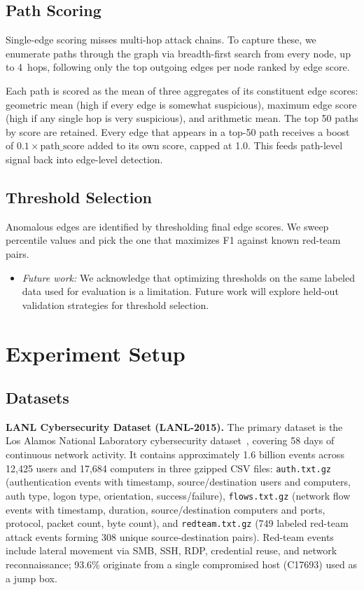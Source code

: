 \subsection{Path Scoring}

Single-edge scoring misses multi-hop attack chains. To capture these, we enumerate paths through the graph via breadth-first search from every node, up to 4~hops, following only the top outgoing edges per node ranked by edge score.

Each path is scored as the mean of three aggregates of its constituent edge scores: geometric mean (high if every edge is somewhat suspicious), maximum edge score (high if any single hop is very suspicious), and arithmetic mean. The top 50 paths by score are retained. Every edge that appears in a top-50 path receives a boost of $0.1 \times \text{path\_score}$ added to its own score, capped at 1.0. This feeds path-level signal back into edge-level detection.

\subsection{Threshold Selection}

Anomalous edges are identified by thresholding final edge scores. We sweep percentile values and pick the one that maximizes F1 against known red-team pairs.

\begin{itemize}
\item \textit{Future work:} We acknowledge that optimizing thresholds on the same labeled data used for evaluation is a limitation. Future work will explore held-out validation strategies for threshold selection.
\end{itemize}


\section{Experiment Setup}

\subsection{Datasets}

\textbf{LANL Cybersecurity Dataset (LANL-2015).}
The primary dataset is the Los Alamos National Laboratory cybersecurity dataset~\cite{kent-2015-cyberdata1}, covering 58 days of continuous network activity. It contains approximately 1.6 billion events across 12,425 users and 17,684 computers in three gzipped CSV files: \texttt{auth.txt.gz} (authentication events with timestamp, source/destination users and computers, auth type, logon type, orientation, success/failure), \texttt{flows.txt.gz} (network flow events with timestamp, duration, source/destination computers and ports, protocol, packet count, byte count), and \texttt{redteam.txt.gz} (749 labeled red-team attack events forming 308 unique source-destination pairs). Red-team events include lateral movement via SMB, SSH, RDP, credential reuse, and network reconnaissance; 93.6\% originate from a single compromised host (C17693) used as a jump box.

